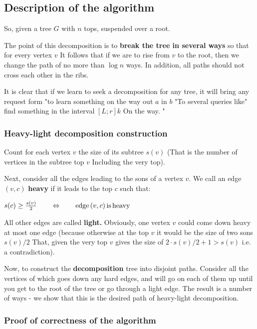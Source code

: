 \subsection{ Description of the algorithm }

So, given a tree $G$ with $n$ tops, suspended over a root.

The point of this decomposition is to \textbf{break the tree in several ways} so that for every vertex $v$ It follows that if we are to rise from $v$ to the root, then we change the path of no more than $\log n$ ways. In addition, all paths should not cross each other in the ribs.

It is clear that if we learn to seek a decomposition for any tree, it will bring any request form "to learn something on the way out $a$ in $b$ "To several queries like" find something in the interval $[L; r]$$k$ On the way. "

\subsubsection{ Heavy-light decomposition construction }

Count for each vertex $v$ the size of its subtree $s (v)$ (That is the number of vertices in the subtree top $v$ Including the very top).

Next, consider all the edges leading to the sons of a vertex $v$. We call an edge $(v, c)$ \textbf{heavy} if it leads to the top $c$ such that:

$s(c)\ge\frac{s(v)}{2}\qquad\Leftrightarrow\qquad{\rm edge\,}(v,c){\rm \, is\, heavy}$

All other edges are called \textbf{light.} Obviously, one vertex $v$ could come down heavy at most one edge (because otherwise at the top $v$ it would be the size of two sons $s (v) / 2$ That, given the very top $v$ gives the size of $2 \cdot s (v) / 2 + 1> s (v)$ i.e. a contradiction).

Now, to construct the \textbf{decomposition} tree into disjoint paths. Consider all the vertices of which goes down any hard edges, and will go on each of them up until you get to the root of the tree or go through a light edge. The result is a number of ways - we show that this is the desired path of heavy-light decomposition.

\subsubsection{ Proof of correctness of the algorithm }

